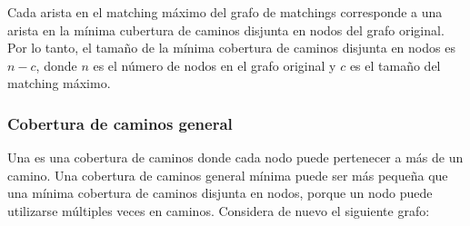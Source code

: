Cada arista en el matching máximo del grafo de matchings corresponde
a una arista en la mínima cubertura de caminos disjunta en nodos del
grafo original. Por lo tanto, el tamaño de la mínima cobertura de
caminos disjunta en nodos es $n-c$, donde $n$ es el número de nodos
en el grafo original y $c$ es el tamaño del matching máximo.

\subsubsection{Cobertura de caminos general}

Una  es una cobertura de caminos
donde cada nodo puede pertenecer a más de un camino. Una cobertura
de caminos general mínima puede ser más pequeña que una mínima cobertura
de caminos disjunta en nodos, porque un nodo puede utilizarse
múltiples veces en caminos. Considera de nuevo el siguiente grafo:
\begin{center}
\end{center}

